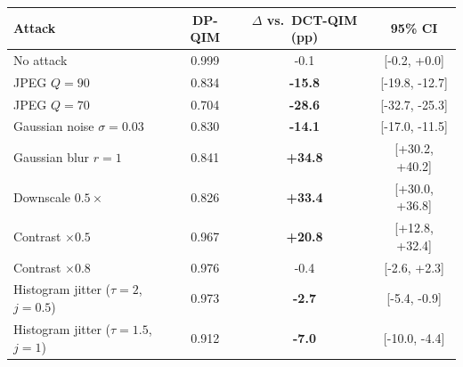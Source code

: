 \begin{tabular}{lccc}
\toprule
Attack & DP-QIM & $\Delta$ vs.\ DCT-QIM (pp) & 95\% CI \\
\midrule
No attack & 0.999 & -0.1 & [-0.2, +0.0] \\
JPEG $Q{=}90$ & 0.834 & \textbf{-15.8} & [-19.8, -12.7] \\
JPEG $Q{=}70$ & 0.704 & \textbf{-28.6} & [-32.7, -25.3] \\
Gaussian noise $\sigma{=}0.03$ & 0.830 & \textbf{-14.1} & [-17.0, -11.5] \\
Gaussian blur $r{=}1$ & 0.841 & \textbf{+34.8} & [+30.2, +40.2] \\
Downscale $0.5\times$ & 0.826 & \textbf{+33.4} & [+30.0, +36.8] \\
Contrast $\times 0.5$ & 0.967 & \textbf{+20.8} & [+12.8, +32.4] \\
Contrast $\times 0.8$ & 0.976 & -0.4 & [-2.6, +2.3] \\
Histogram jitter ($\tau{=}2$, $j{=}0.5$) & 0.973 & \textbf{-2.7} & [-5.4, -0.9] \\
Histogram jitter ($\tau{=}1.5$, $j{=}1$) & 0.912 & \textbf{-7.0} & [-10.0, -4.4] \\
\bottomrule
\end{tabular}

